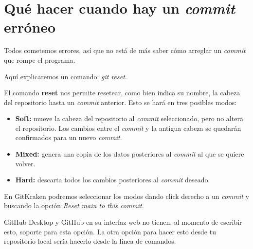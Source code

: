 \section{Qué hacer cuando hay un \textit{commit} erróneo}

Todos cometemos errores, así que no está de más saber cómo arreglar un \textit{commit} que rompe el programa.

Aquí explicaremos un comando: \textit{git reset}.

El comando \textbf{reset} nos permite resetear, como bien indica su nombre, la cabeza del repositorio hasta un \textit{commit} anterior.
Esto se hará en tres posibles modos:
\begin{itemize}
    \item\textbf{Soft:} mueve la cabeza del repositorio al \textit{commit} seleccionado, pero no altera el repositorio. Los cambios entre el \textit{commit} y la antigua cabeza se quedarán confirmados para un nuevo \textit{commit}.
    \item\textbf{Mixed:} genera una copia de los datos posteriores al \textit{commit} al que se quiere volver.
    \item\textbf{Hard:} descarta todos los cambios posteriores al \textit{commit} deseado.
\end{itemize}

En GitKraken podremos seleccionar los modos dando click derecho a un \textit{commit} y buscando la opción \textit{Reset main to this commit}.

GitHub Desktop y GitHub en su interfaz web no tienen, al momento de escribir esto, soporte para esta opción. La otra opción para hacer esto desde tu repositorio local sería hacerlo desde la línea de comandos.
